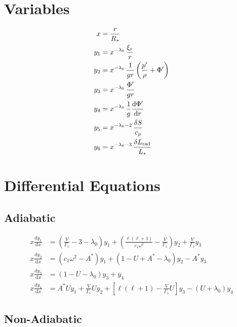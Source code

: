 \documentclass{article}
\newcommand{\diff}{\ensuremath{\mathrm{d}}}
\newcommand{\lz}{\ensuremath{\lambda_{0}}}
\newcommand{\Vg}{\ensuremath{\frac{V}{\Gamma_{1}}}}
\newcommand{\As}{\ensuremath{A^{\ast}}}
\newcommand{\Rstar}{\ensuremath{R_{\ast}}}
\newcommand{\Lrad}{\ensuremath{L_{\rm rad}}}
\newcommand{\Lstar}{\ensuremath{L_{\ast}}}
\begin{document}
\section*{Variables}

\begin{align*}
x     &= \frac{r}{\Rstar} \\
y_{1} &= x^{-\lz}\, \frac{\xi_{r}}{r} \\
y_{2} &= x^{-\lz}\, \frac{1}{gr} \left( \frac{p'}{\rho} + \Phi' \right)\\
y_{3} &= x^{-\lz}\, \frac{\Phi'}{gr}\\
y_{4} &= x^{-\lz}\, \frac{1}{g} \frac{\diff \Phi'}{\diff r}\\
y_{5} &= x^{-\lz-2}\, \frac{\delta S}{c_{p}}\\
y_{6} &= x^{-\lz-3}\, \frac{\delta \Lrad}{\Lstar}
\end{align*}


\section*{Differential Equations}


\subsection*{Adiabatic}

\begin{align*}
x \frac{\diff y_{1}}{\diff x} &=
\left(\Vg - 3 - \lz \right) y_{1} +
\left(\frac{\ell(\ell+1)}{c_{1} \omega^{2}} - \Vg \right) y_{2} +
\Vg y_{3} \\
x \frac{\diff y_{2}}{\diff x} &=
(c_{1} \omega^{2} - \As ) y_{1} +
(1 - U + \As - \lz) y_{2} -
\As y_{3} \\
x \frac{\diff y_{3}}{\diff x} &=
(1 - U - \lz) y_{3} +
y_{4} \\
x \frac{\diff y_{4}}{\diff x} &=
\As U y_{1} +
\Vg U y_{2} +
\left[ \ell(\ell+1) - \Vg U \right] y_{3} -
(U + \lz) y_{4}
\end{align*}


\subsection*{Non-Adiabatic}
\end{document}
